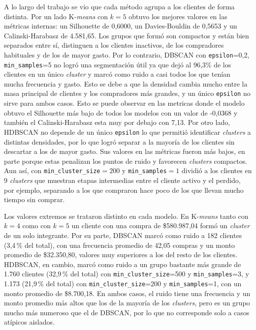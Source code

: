 \documentclass[a4paper,10pts,openany]{book}
\begin{document}
	A lo largo del trabajo se vio que cada método agrupa a los clientes de forma distinta. Por un lado K-\emph{means} con $k=5$ obtuvo los mejores valores en las métricas internas: un Silhouette de 0{,}6000, un Davies-Bouldin de 0{,}5653 y un Calinski-Harabasz de 4.581{,}65. Los grupos que formó son compactos y están bien separados entre sí,  distinguen a los clientes inactivos, de los compradores habituales y de los de mayor gasto. Por lo contrario, DBSCAN con \texttt{epsilon}=0{,}2, \texttt{min\_samples}=5 no logró una segmentación útil ya que dejó al 96{,}3\% de los clientes en un único \emph{cluster} y marcó como ruido a casi todos los que tenían mucha frecuencia y gasto. Esto se debe a que la densidad cambia mucho entre la masa principal de clientes y los compradores más grandes, y un único \texttt{epsilon} no sirve para ambos casos. Esto se puede observar en las metricas donde el modelo obtuvo el Silhouette más bajo de todos los modelos con un valor de -0{,}0368 y también el Calinski-Harabasz esta muy por debajo  con 7{,}13. Por otro lado, HDBSCAN no depende de un único \texttt{epsilon} lo que permitió identificar \emph{clusters} a distintas densidades, por lo que logró separar a la mayoría de los clientes sin descartar a los de mayor gasto. Sus valores en las métricas fueron más bajos, en parte porque estas penalizan los puntos de ruido y favorecen \emph{clusters} compactos. Aun así, con \texttt{min\_cluster\_size}$=200$ y \texttt{min\_samples}$=1$ dividió a los clientes en 9 \emph{clusters} que muestran etapas intermedias entre el cliente activo y el perdido, por ejemplo, separando a los que compraron hace poco de los que llevan mucho tiempo sin comprar.
	
	Los valores extremos se trataron distinto en cada modelo. En K-\emph{means} tanto con $k=4$ como con $k=5$ un cliente con una compra de \$580.987{,}04 formó un \emph{cluster} de un solo integrante. Por su parte, DBSCAN marcó como ruido a 182 clientes (3{,}4\,\% del total), con una frecuencia promedio de 42{,}05 compras y un monto promedio de \$32.350{,}80, valores muy superiores a los del resto de los clientes. HDBSCAN, en cambio, marcó como ruido a un grupo bastante más grande de 1.760 clientes (32{,}9\,\% del total) con \texttt{min\_cluster\_size}=500 y \texttt{min\_samples}=3, y 1.173 (21{,}9\,\% del total) con \texttt{min\_cluster\_size}=200 y \texttt{min\_samples}=1, con un monto promedio de \$8.700{,}18. En ambos casos, el ruido tiene una frecuencia y un monto promedio más altos que los de la mayoría de los \emph{clusters}, pero es un grupo mucho más numeroso que el de DBSCAN, por lo que no corresponde solo a casos atípicos aislados.
	
\end{document}
